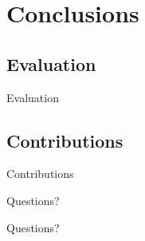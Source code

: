 \documentclass[usenames,dvipsnames]{beamer}
\begin{document}

\section{Conclusions}
\subsection{Evaluation}

\begin{frame}{Evaluation}
\end{frame}

\subsection{Contributions}

\begin{frame}{Contributions}
\end{frame}


\begin{frame}{Questions?}
  \begin{center}
    \huge Questions?
  \end{center}

  
  \nocite{Myreen10}
  \footnotesize
  
\end{frame}
\end{document}

